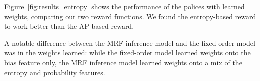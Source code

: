 Figure~\ref{fig:results_entropy} shows the performance of the polices with learned weights, comparing our two reward functions.
We found the entropy-based reward to work better than the AP-based reward.

A notable difference between the MRF inference model and the fixed-order model was in the weights learned: while the fixed-order model learned weights onto the bias feature only, the MRF inference model learned weights onto a mix of the entropy and probability features.